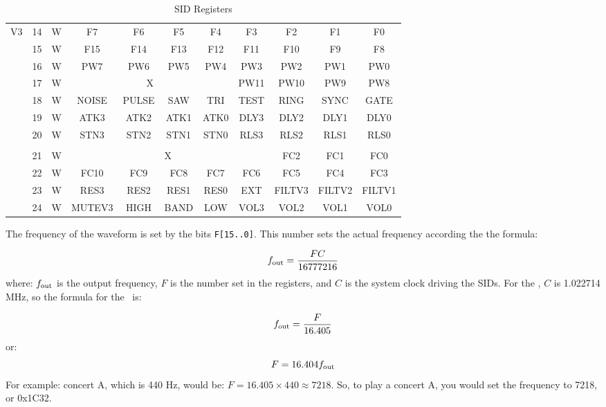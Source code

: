 \begin{table}[h]
\begin{center}
\begin{tabular}{|c|c|c|c|c|c|c|c|c|c|c|}
            \multirow{7}{*}{V3} & 14 & W & F7 & F6 & F5 & F4 & F3 & F2 & F1 & F0 \\ \cline{2-11}
            & 15 & W & F15 & F14 & F13 & F12 & F11 & F10 & F9 & F8 \\ \cline{2-11}
            & 16 & W & PW7 & PW6 & PW5 & PW4 & PW3 & PW2 & PW1 & PW0 \\ \cline{2-11}
            & 17 & W & \multicolumn{4}{|c|}{X} & PW11 & PW10 & PW9 & PW8 \\ \cline{2-11}
            & 18 & W & NOISE & PULSE & SAW & TRI & TEST & RING & SYNC & GATE \\ \cline{2-11}
            & 19 & W & ATK3 & ATK2 & ATK1 & ATK0 & DLY3 & DLY2 & DLY1 & DLY0 \\ \cline{2-11}
            & 20 & W & STN3 & STN2 & STN1 & STN0 & RLS3 & RLS2 & RLS1 & RLS0 \\ \hline

            \multicolumn{11}{c}{} \\ \hline

            \multirow{4}{*}{} & 21 & W & \multicolumn{5}{|c|}{X} & FC2 & FC1 & FC0 \\ \cline{2-11}
            & 22 & W & FC10 & FC9 & FC8 & FC7 & FC6 & FC5 & FC4 & FC3 \\ \cline{2-11}
            & 23 & W & RES3 & RES2 & RES1 & RES0 & EXT & FILTV3 & FILTV2 & FILTV1 \\ \cline{2-11}
            & 24 & W & MUTEV3 & HIGH & BAND & LOW & VOL3 & VOL2 & VOL1 & VOL0 \\ \hline
		\end{tabular}
	\end{center}
	\caption{SID Registers}
	\label{tab:sid_registers}
\end{table}

The frequency of the waveform is set by the bits \verb+F[15..0]+. This number sets the actual frequency according the the formula:

\[
f_{\rm out} = \frac{FC}{16777216}
\]
where: $f_{\rm out}$ is the output frequency, $F$ is the number set in the registers, and $C$ is the system clock driving the SIDs. For the \jr, $C$ is 1.022714 MHz, so the formula for the \jr\ is:

\[
f_{\rm out} = \frac{F}{16.405}
\]
or:
\[
F = 16.404f_{\rm out}
\]
For example: concert A, which is 440 Hz, would be: $F = 16.405 \times 440 \approx 7218$. So, to play a concert A, you would set the frequency to 7218, or 0x1C32.


